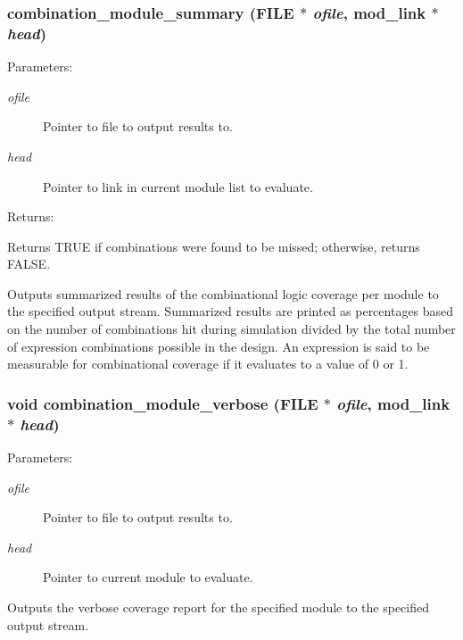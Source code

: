 \subsubsection{ combination\_\-module\_\-summary (FILE $\ast$ {\em ofile}, {\bf mod\_\-link} $\ast$ {\em head})}\label{comb_8c_a9}


\begin{Desc}
\item[Parameters: ]\par
\begin{description}
\item[{\em 
ofile}]Pointer to file to output results to. \item[{\em 
head}]Pointer to link in current module list to evaluate.\end{description}
\end{Desc}
\begin{Desc}
\item[Returns: ]\par
Returns TRUE if combinations were found to be missed; otherwise, returns FALSE.\end{Desc}
Outputs summarized results of the combinational logic coverage per module to the specified output stream. Summarized results are printed as  percentages based on the number of combinations hit during simulation  divided by the total number of expression combinations possible in the  design. An expression is said to be measurable for combinational coverage  if it evaluates to a value of 0 or 1. 
\subsubsection{\setlength{\rightskip}{0pt plus 5cm}void combination\_\-module\_\-verbose (FILE $\ast$ {\em ofile}, {\bf mod\_\-link} $\ast$ {\em head})}\label{comb_8c_a19}


\begin{Desc}
\item[Parameters: ]\par
\begin{description}
\item[{\em 
ofile}]Pointer to file to output results to. \item[{\em 
head}]Pointer to current module to evaluate.\end{description}
\end{Desc}
Outputs the verbose coverage report for the specified module to the specified output stream. 
